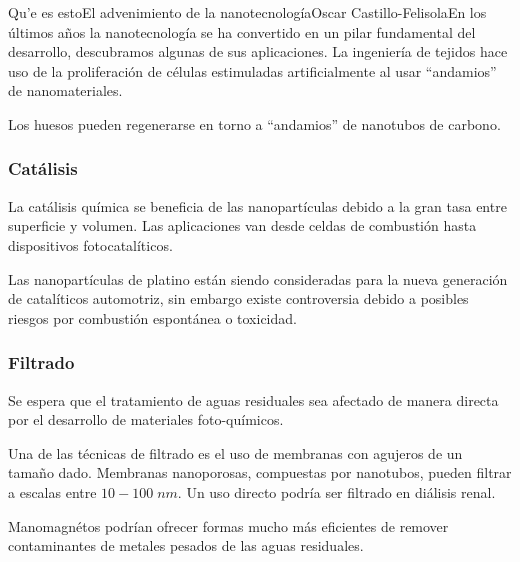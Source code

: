 \begin{Artikel}{Qu'e es esto}{El advenimiento de la nanotecnolog\'ia}{Oscar Castillo-Felisola}{En los \'ultimos a\~nos la nanotecnolog\'ia se ha convertido en un pilar fundamental del desarrollo, descubramos algunas de sus aplicaciones.}
La ingenier\'ia de tejidos hace uso de la proliferaci\'on de c\'elulas estimuladas artificialmente al usar ``andamios'' de nanomateriales.

Los huesos pueden regenerarse en torno a ``andamios'' de nanotubos de carbono.




\subsubsection*{Cat\'alisis}

La cat\'alisis qu\'imica se beneficia de las nanopart\'iculas debido a la gran tasa entre superficie y volumen. Las aplicaciones van desde celdas de combusti\'on hasta dispositivos fotocatal\'iticos.

Las nanopart\'iculas de platino est\'an siendo consideradas para la nueva generaci\'on de catal\'iticos automotriz, sin embargo existe controversia debido a posibles riesgos por combusti\'on espont\'anea o toxicidad.

\subsubsection*{Filtrado}

Se espera que el tratamiento de aguas residuales sea afectado de manera directa por el desarrollo de materiales foto-qu\'imicos.


Una de las t\'ecnicas de filtrado es el uso de membranas con agujeros de un tama\~no dado.  Membranas nanoporosas, compuestas por nanotubos, pueden filtrar a escalas entre $10-100\;nm$. Un uso directo podr\'ia ser filtrado en di\'alisis renal.

Manomagn\'etos podr\'ian ofrecer formas mucho m\'as eficientes de remover contaminantes de metales pesados de las aguas residuales.






\end{Artikel}
